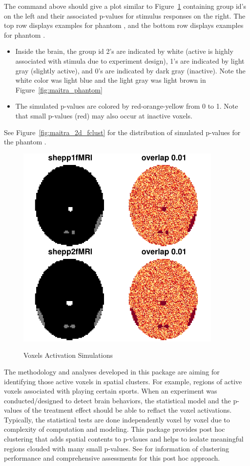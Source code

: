 The command above should give a plot similar to Figure~\ref{fig:maitra_2d}
containing group id's on the left and their associated
p-values for stimulus responses on the right.
The top row displays examples for phantom , and the
bottom row displays examples for phantom .
\begin{itemize}
\item
Inside the brain,
the group id 2's are indicated by white (active is highly associated with
stimula due to experiment design),
1's are indicated by light gray (slightly active),
and 0's are indicated by dark gray (inactive).
Note the white color was light blue
and the light gray was light brown in Figure~\ref{fig:maitra_phantom}
\item
The simulated p-values are colored by red-orange-yellow from 0 to 1.
Note that small p-values (red) may also occur at inactive voxels.
\end{itemize}
See Figure~\ref{fig:maitra_2d_fclust} for the distribution of
simulated p-values for the phantom .

\begin{figure}[h]
\caption{Voxels Activation Simulations}
\centering
\vspace{0.2cm}
\includegraphics[width=4in]{./MixfMRI-include/maitra_2d}
\label{fig:maitra_2d}
\end{figure}

The methodology and analyses developed in this package are aiming for
identifying those active voxels in spatial clusters. For example,
regions of active voxels associated with playing certain sports.
When an experiment was conducted/designed to detect brain behaviors,
the statistical model and the p-values of the treatment effect
should be able to reflact the voxel activations.
Typically, the statistical tests are done independently voxel by voxel
due to complexity of computation and modeling.
This package provides post hoc clustering that adds spatial contents
to p-vlaues and helps to isolate meaningful regions
clouded with many small p-values.
See \cite{ChenMaitra2018} for information of clustering performance and
comprehensive assessments for this post hoc approach.


